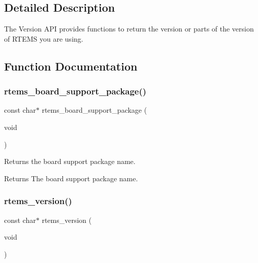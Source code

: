 \subsection{Detailed Description}
The Version A\+PI provides functions to return the version or parts of the version of R\+T\+E\+MS you are using. 



\subsection{Function Documentation}
\mbox{\label{group__RTEMSAPIClassicVersion_gaf80467bcb26ae0c1241e126b251bceed}} 
\subsubsection{\texorpdfstring{rtems\_board\_support\_package()}{rtems\_board\_support\_package()}}
{\footnotesize\ttfamily const char$\ast$ rtems\+\_\+board\+\_\+support\+\_\+package (\begin{DoxyParamCaption}\item[{void}]{ }\end{DoxyParamCaption})}



Returns the board support package name. 

\begin{DoxyReturn}{Returns}
The board support package name. 
\end{DoxyReturn}
\mbox{\label{group__RTEMSAPIClassicVersion_ga3ca3bbb5a6913803c8e50389465d63c5}} 
\subsubsection{\texorpdfstring{rtems\_version()}{rtems\_version()}}
{\footnotesize\ttfamily const char$\ast$ rtems\+\_\+version (\begin{DoxyParamCaption}\item[{void}]{ }\end{DoxyParamCaption})}



